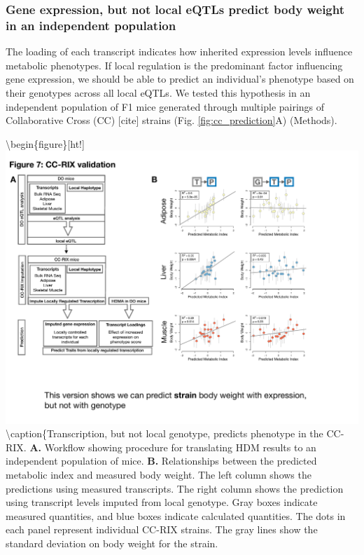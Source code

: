 \documentclass[
]{article}
\begin{document}
\subsubsection{Gene expression, but not local eQTLs predict body weight
in an independent
population}\label{gene-expression-but-not-local-eqtls-predict-body-weight-in-an-independent-population}

The loading of each transcript indicates how inherited expression levels
influence metabolic phenotypes. If local regulation is the predominant
factor influencing gene expression, we should be able to predict an
individual's phenotype based on their genotypes across all local eQTLs.
We tested this hypothesis in an independent population of F1 mice
generated through multiple pairings of Collaborative Cross (CC)
{[}cite{]} strains (Fig. \ref{fig:cc_prediction}A) (Methods).

\textbackslash begin\{figure\}{[}ht!{]}
\includegraphics[width=\textwidth]{Figures/Fig7_CC_Prediction.pdf}
\textbackslash caption\{Transcription, but not local genotype, predicts
phenotype in the CC-RIX. \textbf{A.} Workflow showing procedure for
translating HDM results to an independent population of mice.
\textbf{B.} Relationships between the predicted metabolic index and
measured body weight. The left column shows the predictions using
measured transcripts. The right column shows the prediction using
transcript levels imputed from local genotype. Gray boxes indicate
measured quantities, and blue boxes indicate calculated quantities. The
dots in each panel represent individual CC-RIX strains. The gray lines
show the standard deviation on body weight for the strain.
\end{document}
